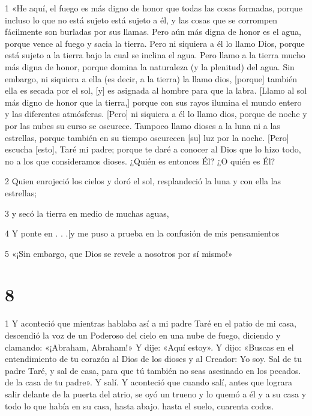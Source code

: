 \par 1 «He aquí, el fuego es más digno de honor que todas las cosas formadas, porque incluso lo que no está sujeto está sujeto a él, y las cosas que se corrompen fácilmente son burladas por sus llamas. Pero aún más digna de honor es el agua, porque vence al fuego y sacia la tierra. Pero ni siquiera a él lo llamo Dios, porque está sujeto a la tierra bajo la cual se inclina el agua. Pero llamo a la tierra mucho más digna de honor, porque domina la naturaleza (y la plenitud) del agua. Sin embargo, ni siquiera a ella (es decir, a la tierra) la llamo dios, [porque] también ella es secada por el sol, [y] es asignada al hombre para que la labra. [Llamo al sol más digno de honor que la tierra,] porque con sus rayos ilumina el mundo entero y las diferentes atmósferas. [Pero] ni siquiera a él lo llamo dios, porque de noche y por las nubes su curso se oscurece. Tampoco llamo dioses a la luna ni a las estrellas, porque también en su tiempo oscurecen [su] luz por la noche. [Pero] escucha [esto], Taré mi padre; porque te daré a conocer al Dios que lo hizo todo, no a los que consideramos dioses. ¿Quién es entonces Él? ¿O quién es Él?

\par 2 Quien enrojeció los cielos y doró el sol, resplandeció la luna y con ella las estrellas;

\par 3 y secó la tierra en medio de muchas aguas,

\par 4 Y ponte en . . .[y me puso a prueba en la confusión de mis pensamientos

\par 5 «¡Sin embargo, que Dios se revele a nosotros por sí mismo!»

\chapter{8}

\par 1 Y aconteció que mientras hablaba así a mi padre Taré en el patio de mi casa, descendió la voz de un Poderoso del cielo en una nube de fuego, diciendo y clamando: «¡Abraham, Abraham!» Y dije: «Aquí estoy». Y dijo: «Buscas en el entendimiento de tu corazón al Dios de los dioses y al Creador: Yo soy. Sal de tu padre Taré, y sal de casa, para que tú también no seas asesinado en los pecados. de la casa de tu padre». Y salí. Y aconteció que cuando salí, antes que lograra salir delante de la puerta del atrio, se oyó un trueno y lo quemó a él y a su casa y todo lo que había en su casa, hasta abajo. hasta el suelo, cuarenta codos.

